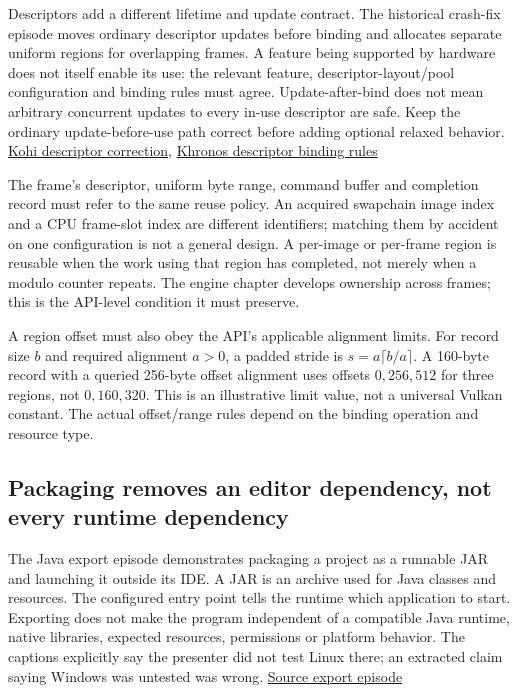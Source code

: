 Descriptors add a different lifetime and update contract. The historical crash-fix episode moves ordinary descriptor updates before binding and allocates separate uniform regions for overlapping frames. A feature being supported by hardware does not itself enable its use: the relevant feature, descriptor-layout/pool configuration and binding rules must agree. Update-after-bind does not mean arbitrary concurrent updates to every in-use descriptor are safe. Keep the ordinary update-before-use path correct before adding optional relaxed behavior. \href{https://www.youtube.com/watch?v=U4QvUeUL37Y}{Kohi descriptor correction}, \href{https://docs.vulkan.org/spec/latest/chapters/descriptorsets.html}{Khronos descriptor binding rules}

The frame's descriptor, uniform byte range, command buffer and completion record must refer to the same reuse policy. An acquired swapchain image index and a CPU frame-slot index are different identifiers; matching them by accident on one configuration is not a general design. A per-image or per-frame region is reusable when the work using that region has completed, not merely when a modulo counter repeats. The engine chapter develops ownership across frames; this is the API-level condition it must preserve.

A region offset must also obey the API's applicable alignment limits. For record size \(b\) and required alignment \(a>0\), a padded stride is \(s=a\lceil b/a\rceil\). A 160-byte record with a queried 256-byte offset alignment uses offsets \(0,256,512\) for three regions, not \(0,160,320\). This is an illustrative limit value, not a universal Vulkan constant. The actual offset/range rules depend on the binding operation and resource type.

\subsection{Packaging removes an editor dependency, not every runtime dependency}\label{05-engine-i-ch008-packaging-removes-an-editor-dependency-not-every-runtime-dependency}

The Java export episode demonstrates packaging a project as a runnable JAR and launching it outside its IDE. A JAR is an archive used for Java classes and resources. The configured entry point tells the runtime which application to start. Exporting does not make the program independent of a compatible Java runtime, native libraries, expected resources, permissions or platform behavior. The captions explicitly say the presenter did not test Linux there; an extracted claim saying Windows was untested was wrong. \href{https://www.youtube.com/watch?v=velhSXA2CnQ}{Source export episode}

